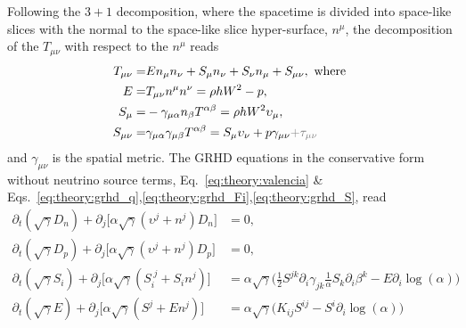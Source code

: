 %
Following the $3+1$ decomposition, 
where the spacetime is divided into space-like slices with the normal to the space-like slice 
hyper-surface, $n^{\mu}$, the decomposition of the $T_{\mu\nu}$ with respect to the $n^{\mu}$ reads
%
%
%
%
%
%
\begin{subequations}
\begin{align}
T_{\mu\nu} =& En_{\mu}n_{\nu} + S_{\mu}n_{\nu} + S_{\nu}n_{\mu} + S_{\mu\nu}, \text{ where } \\
E =& T_{\mu\nu}n^{\mu}n^{\nu} = \rho h W^2 - p, \\
S_{\mu} =& -\gamma_{\mu\alpha}n_{\beta}T^{\alpha\beta} = \rho h W^2 \upsilon_{\mu}, \\
S_{\mu\nu} =& \gamma_{\mu\alpha}\gamma_{\mu\beta}T^{\alpha\beta} = S_{\mu}\upsilon_{\nu} + p \gamma_{\mu\nu} \gray{ + \tau_{\mu\nu}}
\end{align}
\end{subequations}
%
and $\gamma_{\mu\nu}$ is the spatial metric.
%
The \ac{GRHD} equations in the conservative form without neutrino source terms,
Eq.~\eqref{eq:theory:valencia} \&
Eqs.~\eqref{eq:theory:grhd_q},\eqref{eq:theory:grhd_Fi},\eqref{eq:theory:grhd_S}, 
read 
%
\begin{equation}
\label{eq:theory:whisky:emomcons_lk}
\begin{aligned}
\partial_t(\sqrt{\gamma}D_n) + \partial_j\Big[ \alpha\sqrt{\gamma}(\upsilon^j + n^j)D_n \Big] &= 0, \\
\partial_t(\sqrt{\gamma}D_p) + \partial_j\Big[ \alpha\sqrt{\gamma}(\upsilon^j + n^j)D_p \Big] &= 0, \\
\partial_t(\sqrt{\gamma}S_i) + \partial_j\Big[ \alpha \sqrt{\gamma} (S_i^{\; j} + S_i n^j) \Big] &= 
\alpha \sqrt{\gamma}\Big( \frac{1}{2} S^{jk} \partial_i \gamma_{jk} \frac{1}{\alpha} S_k \partial_i \beta^k - E\partial_i \log(\alpha) \Big) \\
\partial_t(\sqrt{\gamma}E) + \partial_j\Big[ \alpha \sqrt{\gamma} (S^{j} + E n^j) \Big] &= 
\alpha \sqrt{\gamma}\Big( K_{ij}S^{ij} - S^i\partial_i \log(\alpha) \Big) 
\end{aligned}
\end{equation}
